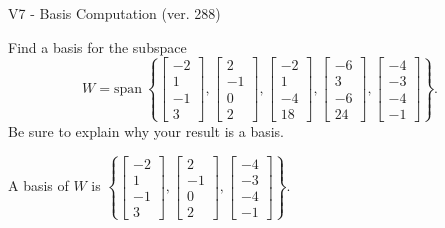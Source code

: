 \begin{exercise}
  \begin{exerciseTitle}V7 - Basis Computation (ver. 288)\end{exerciseTitle}
  \begin{exerciseStatement}
    Find a basis for the subspace 
\[W=\mathrm{span}\ \left\{\left[\begin{array}{r}
-2 \\
1 \\
-1 \\
3
\end{array}\right] , \left[\begin{array}{r}
2 \\
-1 \\
0 \\
2
\end{array}\right] , \left[\begin{array}{r}
-2 \\
1 \\
-4 \\
18
\end{array}\right] , \left[\begin{array}{r}
-6 \\
3 \\
-6 \\
24
\end{array}\right] , \left[\begin{array}{r}
-4 \\
-3 \\
-4 \\
-1
\end{array}\right]\right\}.\]
 Be sure to explain why your result is a basis.


  \end{exerciseStatement}
  \begin{exerciseAnswer}
   A basis of \(W\) is  \(\left\{\left[\begin{array}{r}
-2 \\
1 \\
-1 \\
3
\end{array}\right] , \left[\begin{array}{r}
2 \\
-1 \\
0 \\
2
\end{array}\right] , \left[\begin{array}{r}
-4 \\
-3 \\
-4 \\
-1
\end{array}\right]\right\}\).
  


  \end{exerciseAnswer}
\end{exercise}